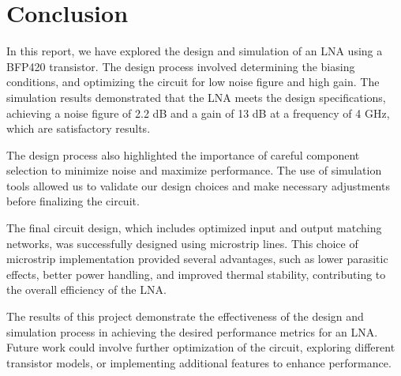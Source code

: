 \section{Conclusion}

In this report, we have explored the design and simulation of an LNA using a BFP420 transistor. The design process involved determining the biasing conditions, and optimizing the circuit for low noise figure and high gain. The simulation results demonstrated that the LNA meets the design specifications, achieving a noise figure of 2.2 dB and a gain of 13 dB at a frequency of 4 GHz, which are satisfactory results.

The design process also highlighted the importance of careful component selection to minimize noise and maximize performance. The use of simulation tools allowed us to validate our design choices and make necessary adjustments before finalizing the circuit.

The final circuit design, which includes optimized input and output matching networks, was successfully designed using microstrip lines. This choice of microstrip implementation provided several advantages, such as lower parasitic effects, better power handling, and improved thermal stability, contributing to the overall efficiency of the LNA.

The results of this project demonstrate the effectiveness of the design and simulation process in achieving the desired performance metrics for an LNA. Future work could involve further optimization of the circuit, exploring different transistor models, or implementing additional features to enhance performance.